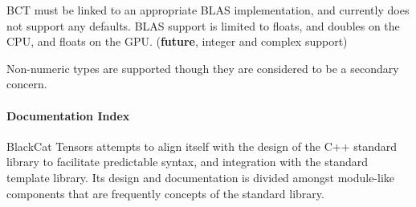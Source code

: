 B\+CT must be linked to an appropriate B\+L\+AS implementation, and currently does not support any defaults. B\+L\+AS support is limited to floats, and doubles on the C\+PU, and floats on the G\+PU. ({\bfseries future}, integer and complex support)

Non-\/numeric types are supported though they are considered to be a secondary concern.

\paragraph*{Documentation Index}

Black\+Cat Tensors attempts to align itself with the design of the C++ standard library to facilitate predictable syntax, and integration with the standard template library. Its design and documentation is divided amongst module-\/like components that are frequently concepts of the standard library.

